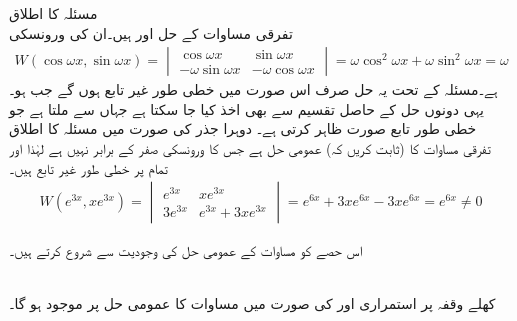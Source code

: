 \quad مسئلہ  کا اطلاق\\
تفرقی مساوات  کے حل  اور   ہیں۔ان کی ورونسکی
\begin{align*}
W(\cos \omega x,\sin \omega x)=
\begin{vmatrix}
\cos \omega x &\sin \omega x\\[0.25em]
-\omega \sin \omega x & -\omega \cos \omega x
\end{vmatrix}
=\omega \cos^2 \omega x+\omega \sin^2 \omega x=\omega
\end{align*}
ہے۔مسئلہ  کے تحت یہ حل صرف اس صورت میں خطی طور غیر تابع ہوں گے جب  ہو۔یہی دونوں حل کے حاصل تقسیم  سے بھی اخذ کیا جا سکتا ہے جہاں  سے  ملتا ہے جو خطی طور تابع صورت ظاہر کرتی ہے۔
\quad دوہرا جذر کی صورت میں مسئلہ  کا اطلاق\\
تفرقی مساوات  کا (ثابت کریں کہ) عمومی حل     ہے جس کا ورونسکی صفر کے برابر نہیں ہے لہٰذا  اور  تمام  پر خطی طور غیر تابع ہیں۔
\begin{align*}
W(e^{3x},xe^{3x})=
\begin{vmatrix}
e^{3x}& xe^{3x}\\[0.25em]
3e^{3x}&e^{3x}+3xe^{3x}
\end{vmatrix}
=e^{6x}+3xe^{6x}-3xe^{6x}=e^{6x} \ne 0
\end{align*}

اس حصے کو مساوات  کے عمومی حل کی وجودیت سے شروع کرتے ہیں۔

\quad {}\\
کھلے وقفہ  پر استمراری  اور  کی صورت میں مساوات  کا عمومی حل  پر موجود ہو گا۔

